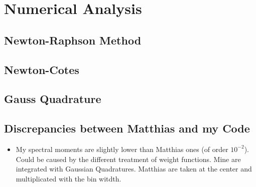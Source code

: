 		
	
		

		
		
\section{Numerical Analysis}
\cite{Chapra2010} \cite{Press2007}
\subsection{Newton-Raphson Method}
\subsection{Newton-Cotes}
\subsection{Gauss Quadrature}

\subsection{Discrepancies between Matthias and my Code}
\begin{itemize}
	\item My spectral moments are slightly lower than Matthias ones (of order $10^{-2}$). Could be caused by the different treatment of weight functions. Mine are integrated with Gaussian Quadratures. Matthias are taken at the center and multiplicated with the bin witdth.
\end{itemize}
